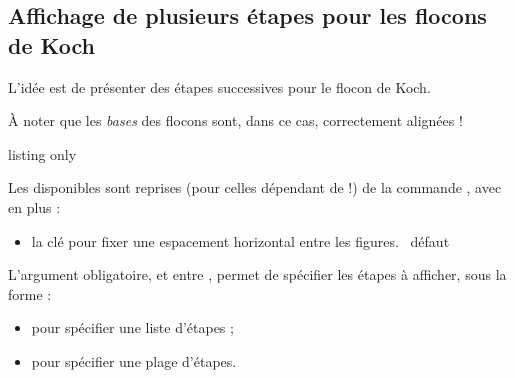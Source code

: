 \begin{PresCodeTexPL}{}
\FractaleTikz[Type=Sierp]
\end{PresCodeTexPL}

\begin{PresCodeTexPL}{}
\FractaleTikz[Type=Sierp,LongueurCote=4,Couleur=blue]
\end{PresCodeTexPL}

\subsection{Affichage de plusieurs étapes pour les flocons de Koch}

\begin{tipblock}
L'idée est de présenter des étapes successives pour le flocon de Koch.

À noter que les \textit{bases} des flocons sont, dans ce cas, correctement alignées !
\end{tipblock}

\begin{PresCodeTexPL}{listing only}
\end{PresCodeTexPL}

\begin{cautionblock}
Les  disponibles sont reprises (pour celles dépendant de  !) de la commande , avec en plus :

\begin{itemize}
	\item la clé  pour fixer une espacement horizontal entre les figures. \hfill~défaut \Cle{2pt}
\end{itemize}

L'argument obligatoire, et entre , permet de spécifier les étapes à afficher, sous la forme \TikZ{} :

\begin{itemize}
	\item {} pour spécifier une liste d'étapes ;
	\item {} pour spécifier une plage d'étapes.
\end{itemize}
\vspace*{-\baselineskip}\leavevmode
\end{cautionblock}

\begin{PresCodeTexPL}{}
\end{PresCodeTexPL}

